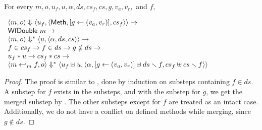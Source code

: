 \begin{lemma}
  \label{lem-inlinedmm-meth1}
  \mbox{}\\
  For every $m, o, u_f, u, \alpha, ds, cs_f, cs, g, v_a, v_r,$ and $f,$
  \begin{center}
    \begin{math}
      \begin{array}{l}
        \langle m, o \rangle \Downarrow \langle u_f, \langle \textsf{Meth},  [ g \leftarrow (v_a, v_r) ], cs_f \rangle \rangle \to \\
        \textsf{WfDouble}\ m \to \\
        \langle m, o \rangle \Downarrow^{\ast} \langle u, \langle \alpha, ds, cs \rangle \rangle \to \\
        f \in cs_f \to f \in ds \to g \notin ds \to \\
        u_f \ast u \to cs_f \ast cs \to \\
        \langle m \hookleftarrow_{m}{} f, o \rangle \Downarrow^{\ast} \langle u_f \uplus u, \langle \alpha,  [ g \leftarrow (v_a, v_r) ] \uplus ds \smallsetminus{} f, cs_f \uplus cs \smallsetminus{} f \rangle \rangle
      \end{array}
    \end{math}
  \end{center}
\end{lemma}
\begin{proof}
  The proof is similar to , done by
  induction on substeps containing $f \in ds$. A substep for $f$
  exists in the substeps, and with the substep for $g$, we get the
  merged substep by . The other
  substeps except for $f$ are treated as an intact case. Additionally,
  we do not have a conflict on defined methods while merging, since $g
  \notin ds$.
\end{proof}


